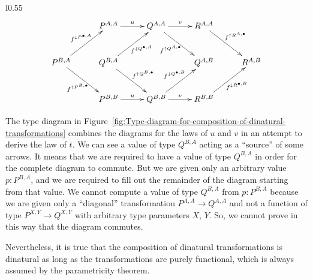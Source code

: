 \begin{wrapfigure}[12]{l}{0.55\columnwidth}%
\vspace{-1.6\baselineskip}
\[
\xymatrix{\xyScaleY{2.3pc}\xyScaleX{2.3pc} & P^{A,A}\ar[r]\sp(0.5){u} & Q^{A,A}\ar[r]\sp(0.5){v}\ar[rd]\sb(0.45){f^{\uparrow Q^{A,\bullet}}\negthickspace\negthickspace} & R^{A,A}\ar[rd]\sp(0.45){f^{\uparrow R^{A,\bullet}}}\\
P^{B,A}\ar[ru]\sp(0.5){f^{\downarrow P^{\bullet,A}}\negthickspace\negthickspace\negthickspace\negthickspace}\ar[rd]\sb(0.5){f^{\uparrow P^{B,\bullet}}\negthickspace\negthickspace} & Q^{B,A}\ar[ru]\sb(0.55){\negthickspace\negthickspace f^{\downarrow Q^{\bullet,A}}}\ar[rd]\sp(0.5){f^{\uparrow Q^{B,\bullet}}\negthickspace\negthickspace} &  & Q^{A,B} & R^{A,B}\\
 & P^{B,B}\ar[r]\sp(0.5){u} & Q^{B,B}\ar[r]\sp(0.5){v}\ar[ru]\sp(0.5){f^{\downarrow Q^{\bullet,B}}\negthickspace\negthickspace\negthickspace} & R^{B,B}\ar[ru]\sb(0.55){\negthickspace\negthickspace f^{\downarrow R^{\bullet,B}}}
}
\]

\vspace{-1.1\baselineskip}
\caption{Composition of dinatural transformations.\label{fig:Type-diagram-for-composition-of-dinatural-transformations}}

\vspace{-0\baselineskip}
\end{wrapfigure}%

\noindent The type diagram in Figure~\ref{fig:Type-diagram-for-composition-of-dinatural-transformations}
combines the diagrams for the laws of $u$ and $v$ in an attempt
to derive the law of $t$. We can see a value of type $Q^{B,A}$ acting
as a \textsf{``}source\textsf{''} of some arrows. It means that we are required to
have a value of type $Q^{B,A}$ in order for the complete diagram
to commute. But we are given only an arbitrary value $p:P^{B,A}$,
and we are required to fill out the remainder of the diagram starting
from that value. We cannot compute a value of type $Q^{B,A}$ from
$p:P^{B,A}$ because we are given only a \textsf{``}diagonal\textsf{''} transformation
$P^{A,A}\rightarrow Q^{A,A}$ and not a function of type $P^{X,Y}\rightarrow Q^{X,Y}$
with arbitrary type parameters $X$, $Y$. So, we cannot prove in
this way that the diagram commutes. 

Nevertheless, it is true that the composition of dinatural transformations
is dinatural \textemdash{} as long as the transformations are purely
functional, which is always assumed by the parametricity theorem.

